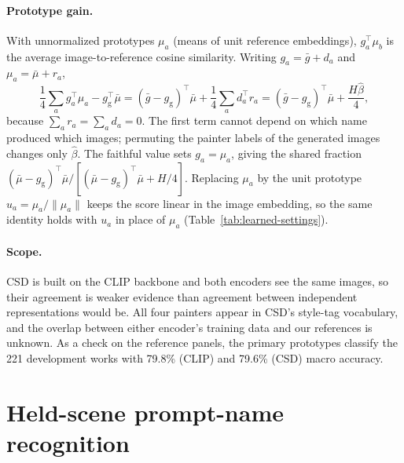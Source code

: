 \paragraph{Prototype gain.} With unnormalized prototypes $\mu_a$ (means of unit reference
embeddings), $g_a^\top\mu_b$ is the average image-to-reference cosine similarity. Writing
$g_a=\bar g+d_a$ and $\mu_a=\bar\mu+r_a$,
\begin{equation}
\frac14\sum_a g_a^\top\mu_a-g_{\mathrm g}^\top\bar\mu
=(\bar g-g_{\mathrm g})^\top\bar\mu+\frac14\sum_a d_a^\top r_a
=(\bar g-g_{\mathrm g})^\top\bar\mu+\frac{H\widehat\beta}{4},
\end{equation}
because $\sum_a r_a=\sum_a d_a=0$. The first term cannot depend on which name produced which
images; permuting the painter labels of the generated images changes only $\widehat\beta$. The
faithful value sets $g_a=\mu_a$, giving the shared fraction $(\bar\mu-g_{\mathrm
g})^\top\bar\mu/[(\bar\mu-g_{\mathrm g})^\top\bar\mu+H/4]$. Replacing $\mu_a$ by the unit
prototype $u_a=\mu_a/\|\mu_a\|$ keeps the score linear in the image embedding, so the same
identity holds with $u_a$ in place of $\mu_a$ (Table~\ref{tab:learned-settings}).






\paragraph{Scope.} CSD is built on the CLIP backbone and both encoders see the same images, so
their agreement is weaker evidence than agreement between independent representations would be. All
four painters appear in CSD's style-tag vocabulary, and the overlap between either encoder's
training data and our references is unknown. As a check on the reference panels, the primary
prototypes classify the 221 development works with 79.8\% (CLIP) and 79.6\% (CSD) macro
accuracy.

\FloatBarrier
\section{Held-scene prompt-name recognition}\label{app:transfer}



